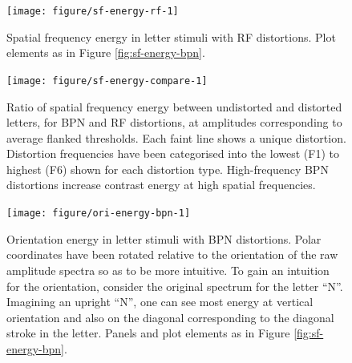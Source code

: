 \documentclass[doc, 11pt,a4paper,natbib]{apa6}\usepackage[]{graphicx}\usepackage[]{color}
\newenvironment{knitrout}{}{} %
\begin{document}
\begin{knitrout}
\color{fgcolor}\begin{figure}
\texttt{[image: figure/sf-energy-rf-1]} \caption{Spatial frequency energy in letter stimuli with RF distortions. Plot elements
              as in Figure \ref{fig:sf-energy-bpn}.}\label{fig:sf-energy-rf}
\end{figure}


\end{knitrout}




\begin{knitrout}
\color{fgcolor}\begin{figure}
\texttt{[image: figure/sf-energy-compare-1]} \caption[Ratio of spatial frequency energy between undistorted and distorted letters,
               for BPN and RF distortions, at amplitudes corresponding to average flanked thresholds]{Ratio of spatial frequency energy between undistorted and distorted letters,
               for BPN and RF distortions, at amplitudes corresponding to average flanked thresholds.
               Each faint line shows a unique distortion.
               Distortion frequencies have been categorised into the lowest (F1) to highest (F6) shown for each
               distortion type.
               High-frequency BPN distortions increase contrast energy at high spatial frequencies.}\label{fig:sf-energy-compare}
\end{figure}


\end{knitrout}



\begin{knitrout}
\color{fgcolor}\begin{figure}
\texttt{[image: figure/ori-energy-bpn-1]} \caption{Orientation energy in letter stimuli with BPN distortions.
              Polar coordinates have been rotated relative to the orientation of the
              raw amplitude spectra so as to be more intuitive.
              To gain an intuition for the orientation, consider the original spectrum for the letter ``N''.
              Imagining an upright ``N'', one can see most energy at vertical orientation and also on the
              diagonal corresponding to the diagonal stroke in the letter.
              Panels and plot elements as in Figure \ref{fig:sf-energy-bpn}.}\label{fig:ori-energy-bpn}
\end{figure}


\end{knitrout}
\end{document}
